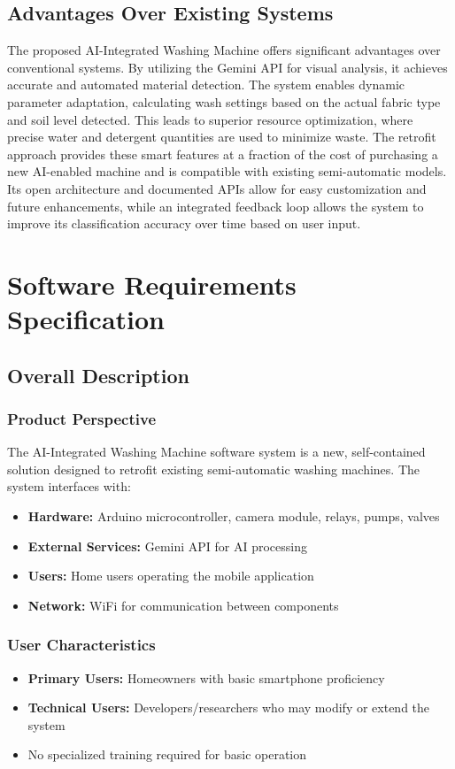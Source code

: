 \subsection{Advantages Over Existing Systems}
The proposed AI-Integrated Washing Machine offers significant advantages over conventional systems. By utilizing the Gemini API for visual analysis, it achieves accurate and automated material detection. The system enables dynamic parameter adaptation, calculating wash settings based on the actual fabric type and soil level detected. This leads to superior resource optimization, where precise water and detergent quantities are used to minimize waste. The retrofit approach provides these smart features at a fraction of the cost of purchasing a new AI-enabled machine and is compatible with existing semi-automatic models. Its open architecture and documented APIs allow for easy customization and future enhancements, while an integrated feedback loop allows the system to improve its classification accuracy over time based on user input.

\section{Software Requirements Specification}

\subsection{Overall Description}
\subsubsection*{Product Perspective}
The AI-Integrated Washing Machine software system is a new, self-contained solution designed to retrofit existing semi-automatic washing machines. The system interfaces with:
\begin{itemize}
    \item \textbf{Hardware:} Arduino microcontroller, camera module, relays, pumps, valves
    \item \textbf{External Services:} Gemini API for AI processing
    \item \textbf{Users:} Home users operating the mobile application
    \item \textbf{Network:} WiFi for communication between components
\end{itemize}

\subsubsection*{User Characteristics}
\begin{itemize}
    \item \textbf{Primary Users:} Homeowners with basic smartphone proficiency
    \item \textbf{Technical Users:} Developers/researchers who may modify or extend the system
    \item No specialized training required for basic operation
\end{itemize}

